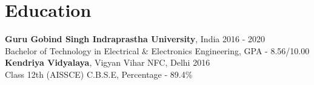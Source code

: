 \documentclass[10pt]{report}
\begin{document}
\section*{\color{BlueViolet}\faBook\hspace{1pt} Education}
\vspace{-1em}
\textbf{Guru Gobind Singh Indraprastha University}, India
\hfill 2016 - 2020\\
Bachelor of Technology in Electrical \& Electronics Engineering, GPA - 8.56/10.00\vspace{4pt}\\
\textbf{Kendriya Vidyalaya}, Vigyan Vihar NFC, Delhi
\hfill 2016\\
Class 12th (AISSCE) C.B.S.E, Percentage - 89.4\%\vspace{-1em}
\end{document}
